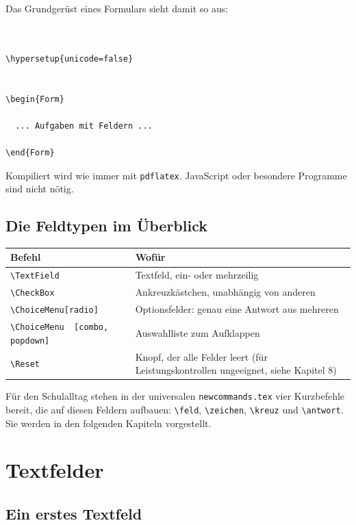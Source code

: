 \begin{Form}
Das Grundgerüst eines Formulars sieht damit so aus:

\begin{lstlisting}[style=latex]


\hypersetup{unicode=false}


\begin{Form}

  ... Aufgaben mit Feldern ...

\end{Form}

\end{lstlisting}


Kompiliert wird wie immer mit \texttt{pdflatex}. JavaScript oder besondere
Programme sind nicht nötig.

\subsection{Die Feldtypen im Überblick}

\renewcommand{\arraystretch}{1.3}
\begin{tabular}{p{4.6cm} p{11cm}}
	\toprule
	\textbf{Befehl} & \textbf{Wofür} \\
	\midrule
	\verb|\TextField| & Textfeld, ein- oder mehrzeilig \\
	\verb|\CheckBox| & Ankreuzkästchen, unabhängig von anderen \\
	\verb|\ChoiceMenu[radio]| & Optionsfelder: genau eine Antwort aus mehreren \\
	\verb|\ChoiceMenu|\newline\verb|  [combo, popdown]| & Auswahlliste zum Aufklappen \\
	\verb|\Reset| & Knopf, der alle Felder leert (für Leistungskontrollen ungeeignet, siehe Kapitel 8) \\
	\bottomrule
\end{tabular}

Für den Schulalltag stehen in der universalen \texttt{newcommands.tex} vier
Kurzbefehle bereit, die auf diesen Feldern aufbauen: \verb|\feld|,
\verb|\zeichen|, \verb|\kreuz| und \verb|\antwort|. Sie werden in den
folgenden Kapiteln vorgestellt.



\section{Textfelder}

\subsection{Ein erstes Textfeld}


\end{Form}
